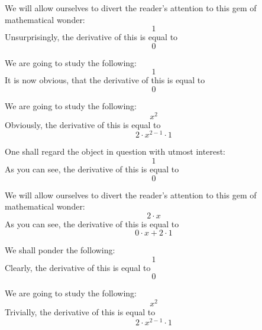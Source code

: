 \documentclass{article}
\begin{document}
We will allow ourselves to divert the reader's attention to this gem of mathematical wonder:
\begin{equation}
1 
\end{equation}
Unsurprisingly, the derivative of this is equal to
\begin{equation}
0 
\end{equation}

We are going to study the following:
\begin{equation}
1 
\end{equation}
It is now obvious, that the derivative of this is equal to
\begin{equation}
0 
\end{equation}

We are going to study the following:
\begin{equation}
x ^{2 } 
\end{equation}
Obviously, the derivative of this is equal to
\begin{equation}
2 \cdot x ^{2 - 1 } \cdot 1 
\end{equation}

One shall regard the object in question with utmost interest:
\begin{equation}
1 
\end{equation}
As you can see, the derivative of this is equal to
\begin{equation}
0 
\end{equation}

We will allow ourselves to divert the reader's attention to this gem of mathematical wonder:
\begin{equation}
2 \cdot x 
\end{equation}
As you can see, the derivative of this is equal to
\begin{equation}
0 \cdot x + 2 \cdot 1 
\end{equation}

We shall ponder the following:
\begin{equation}
1 
\end{equation}
Clearly, the derivative of this is equal to
\begin{equation}
0 
\end{equation}

We are going to study the following:
\begin{equation}
x ^{2 } 
\end{equation}
Trivially, the derivative of this is equal to
\begin{equation}
2 \cdot x ^{2 - 1 } \cdot 1 
\end{equation}
\end{document}
